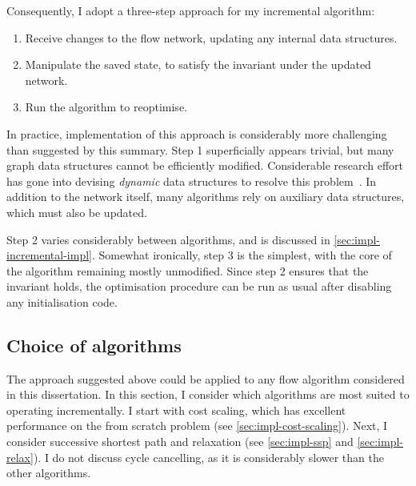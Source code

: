 Consequently, I adopt a three-step approach for my incremental algorithm:

\begin{enumerate}
    \item Receive changes to the flow network, updating any internal data structures.
    \item Manipulate the saved state, to satisfy the invariant under the updated network.
    \item Run the algorithm to reoptimise.
\end{enumerate}

In practice, implementation of this approach is considerably more challenging than suggested by this summary. Step 1 superficially appears trivial, but many graph data structures cannot be efficiently modified. Considerable research effort has gone into devising \emph{dynamic} data structures to resolve this problem~\cite{Tarjan:1983,Eppstein:1996}. In addition to the network itself, many algorithms rely on auxiliary data structures\footnotemark, which must also be updated.

Step 2 varies considerably between algorithms, and is discussed in \cref{sec:impl-incremental-impl}. Somewhat ironically, step 3 is the simplest, with the core of the algorithm remaining mostly unmodified. Since step 2 ensures that the invariant holds, the optimisation procedure can be run as usual after disabling any initialisation code.


\subsection{Choice of algorithms} \label{sec:impl-incremental-choice}
The approach suggested above could be applied to any flow algorithm considered in this dissertation. In this section, I consider which algorithms are most suited to operating incrementally. I start with cost scaling, which has excellent performance on the from scratch problem (see \cref{sec:impl-cost-scaling}). Next, I consider successive shortest path and relaxation (see \cref{sec:impl-ssp} and \cref{sec:impl-relax}). I do not discuss cycle cancelling, as it is considerably slower than the other algorithms.

